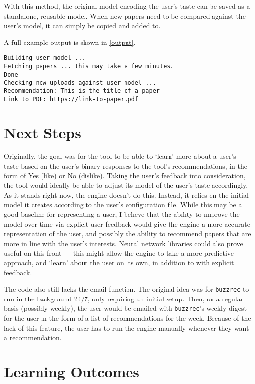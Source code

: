 \documentclass{article}
\begin{document}
With this method, the original model encoding the user's taste can be saved as a standalone, reusable model. When new papers need to be compared against the user's model, it can simply be copied and added to. \newpage 

A full example output is shown in \ref{output}.

\begin{exe}
\ex
\label{output}
\begin{verbatim}
Building user model ...
Fetching papers ... this may take a few minutes.
Done
Checking new uploads against user model ...
Recommendation: This is the title of a paper
Link to PDF: https://link-to-paper.pdf
\end{verbatim}
\end{exe}


\section{Next Steps}
Originally, the goal was for the tool to be able to `learn' more about a user's taste based on the user's binary responses to the tool's recommendations, in the form of Yes (like) or No (dislike). Taking the user's feedback into consideration, the tool would ideally be able to adjust its model of the user's taste accordingly. As it stands right now, the engine doesn't do this. Instead, it relies on the initial model it creates according to the user's configuration file. While this may be a good baseline for representing a user, I believe that the ability to improve the model over time via explicit user feedback would give the engine a more accurate representation of the user, and possibly the ability to recommend papers that are more in line with the user's interests. Neural network libraries could also prove useful on this front — this might allow the engine to take a more predictive approach, and `learn' about the user on its own, in addition to with explicit feedback.  

The code also still lacks the email function. The original idea was for \texttt{buzzrec} to run in the background 24/7, only requiring an initial setup. Then, on a regular basis (possibly weekly), the user would be emailed with \texttt{buzzrec}'s weekly digest for the user in the form of a list of recommendations for the week. Because of the lack of this feature, the user has to run the engine manually whenever they want a recommendation.


\section{Learning Outcomes}
\end{document}

